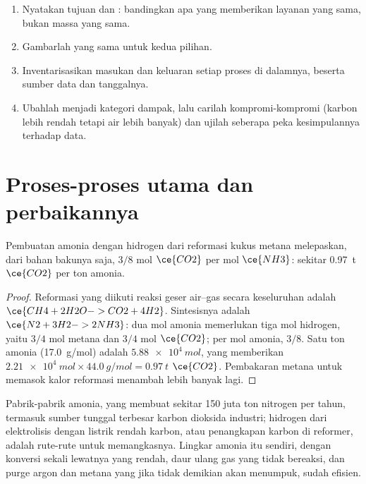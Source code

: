 \begin{method}\label{met:b3:green-industrial:lca}
\begin{enumerate}
  \item Nyatakan tujuan dan : bandingkan apa yang memberikan layanan
        yang sama, bukan massa yang sama.
  \item Gambarlah  yang sama untuk kedua pilihan.
  \item Inventarisasikan masukan dan keluaran setiap proses di dalamnya, beserta sumber
        data dan tanggalnya.
  \item Ubahlah menjadi kategori dampak, lalu carilah kompromi-kompromi (karbon lebih rendah tetapi
        air lebih banyak) dan ujilah seberapa peka kesimpulannya terhadap data.
\end{enumerate}
\end{method}

\section{Proses-proses utama dan perbaikannya}

\begin{proposition}\label{prop:b3:green-industrial:smr}
Pembuatan amonia dengan hidrogen dari reformasi kukus metana melepaskan, dari
bahan bakunya saja, $3/8$ mol $\ce{CO2}$ per mol $\ce{NH3}$: sekitar \qty{0.97}{t} $\ce{CO2}$ per ton amonia.
\end{proposition}

\begin{proof}
Reformasi yang diikuti reaksi geser air--gas secara keseluruhan adalah $\ce{CH4 + 2H2O -> CO2 + 4H2}$. Sintesisnya
adalah $\ce{N2 + 3H2 -> 2NH3}$: dua mol amonia memerlukan tiga mol hidrogen, yaitu $3/4$ mol
metana dan $3/4$ mol $\ce{CO2}$; per mol amonia, $3/8$. Satu ton amonia
(\qty{17.0}{g/mol}) adalah $\qty{5.88e4}{mol}$, yang memberikan $\qty{2.21e4}{mol} \times \qty{44.0}{g/mol} = \qty{0.97}{t}$ $\ce{CO2}$. Pembakaran metana
untuk memasok kalor reformasi menambah lebih banyak lagi.
\end{proof}

Pabrik-pabrik amonia, yang membuat sekitar 150 juta ton nitrogen per tahun, termasuk
sumber tunggal terbesar karbon dioksida industri; hidrogen dari
elektrolisis dengan listrik rendah karbon, atau penangkapan karbon di reformer,
adalah rute-rute untuk memangkasnya. Lingkar amonia itu sendiri, dengan konversi sekali lewatnya yang
rendah, daur ulang gas yang tidak bereaksi, dan purge argon dan metana yang
jika tidak demikian akan menumpuk, sudah efisien.

